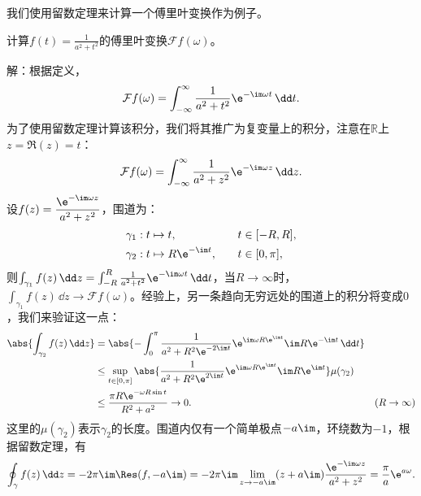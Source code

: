 我们使用留数定理来计算一个傅里叶变换作为例子。
\begin{example}
    计算$\displaystyle f(t)=\frac{1}{a^2+t^2}$的傅里叶变换$\mathcal{F}f(\omega)$。

    解：根据定义，
    \begin{equation}
        \mathcal{F}f(\omega)=\int_{-\infty}^{\infty}\frac{1}{a^2+t^2}\e^{-\im\omega t}\,\dd t.
    \end{equation}
    为了使用留数定理计算该积分，我们将其推广为复变量上的积分，注意在$\mathbb{R}$上$z=\Re(z)=t$：
    \begin{equation}
        \mathcal{F}f(\omega)=\int_{-\infty}^{\infty}\frac{1}{a^2+z^2}\e^{-\im\omega z}\,\dd z.
    \end{equation}
    设$\displaystyle f(z)=\frac{\e^{-\im\omega z}}{a^2+z^2}$，围道为：
    \begin{align}
        \gamma_1&:t\mapsto t,&\quad t&\in[-R,R],\\
        \gamma_2&:t\mapsto R\e^{-\im t},&\quad t&\in[0,\pi],
    \end{align}
    则$\int_{\gamma_1}f(z)\,\dd z=\int_{-R}^{R}\frac{1}{a^2+t^2}\e^{-\im\omega t}\,\dd t$，当$R\to\infty$时，$\int_{\gamma_1}f(z)\,\dd z\to\mathcal{F}f(\omega)$。经验上，另一条趋向无穷远处的围道上的积分将变成$0$，我们来验证这一点：
    \begin{align}
        \abs{\int_{\gamma_2}f(z)\,\dd z}&=\abs{-\int_0^{\pi}\frac{1}{a^2+R^2\e^{-2\im t}}\e^{\im\omega R\e^{\im t}}\im R\e^{-\im t}\,\dd t}\nonumber\\
        &\leq \sup_{t\in[0,\pi]}\abs{\frac{1}{a^2+R^2\e^{2\im t}}\e^{\im\omega R\e^{\im t}}\im R\e^{\im t}}\mu(\gamma_2)\nonumber\\
        &\leq \frac{\pi R\e^{-\omega R\sin t}}{R^2+a^2}\to 0.&(R\to\infty)
    \end{align}
    这里的$\mu(\gamma_2)$表示$\gamma_2$的长度。围道内仅有一个简单极点$-a\im$，环绕数为$-1$，根据留数定理，有
    \begin{equation}
        \oint_{\gamma}f(z)\,\dd z=-2\pi\im\Res(f,-a\im)=-2\pi\im\lim_{z\to -a\im}(z+a\im)\frac{\e^{-\im\omega z}}{a^2+z^2}=\frac{\pi}{a}\e^{a\omega}.
    \end{equation}
\end{example}

